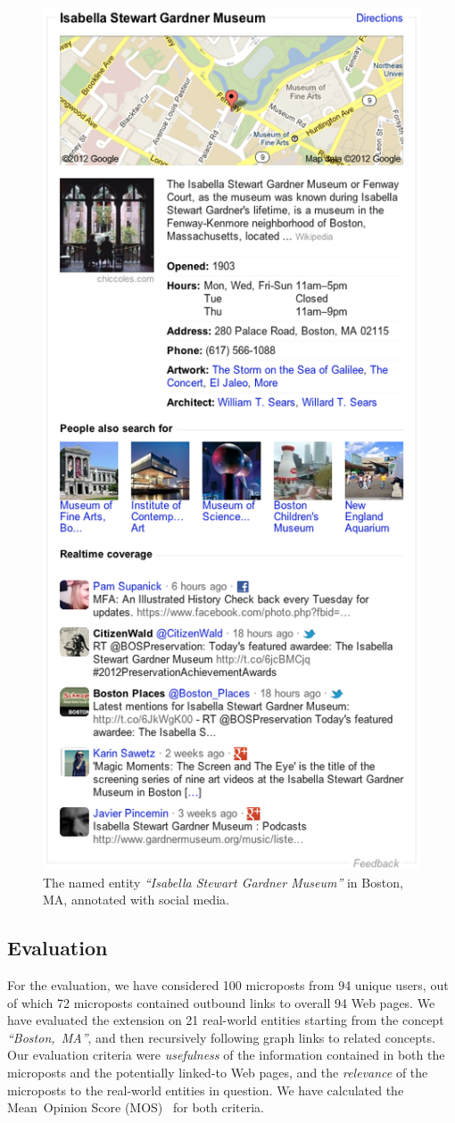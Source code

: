 \begin{figure}[htb]
\centering
\includegraphics[width=0.5\columnwidth]{knowledge_graph_socializer.png}
\caption[The named entity \emph{``Isabella Stewart Gardner Museum''}]
  {The named entity \emph{``Isabella Stewart Gardner Museum''}
  in Boston, MA, annotated with social media.}
\label{fig:socializer}
\end{figure}

\subsection{Evaluation}
For the evaluation, we have considered 100 microposts from 94 unique users,
out of which 72 microposts contained outbound links to overall 94 Web pages.
We have evaluated the extension on 21 real-world entities starting from the concept
\emph{``Boston,~MA''}, and then recursively following graph links to related concepts.
Our evaluation criteria were \emph{usefulness} of the information
contained in both the microposts and the potentially linked-to Web pages,
and the \emph{relevance} of the microposts to the real-world entities in question.
We have calculated the Mean~Opinion Score (MOS)~\cite{mos1998} for both criteria.

